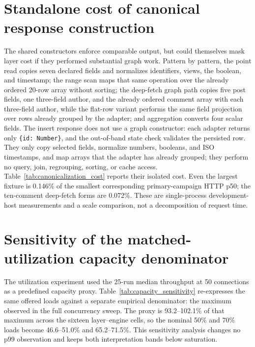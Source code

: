 \documentclass[11pt,a4paper]{article}
\newcommand{\tabledir}{tables/}
\begin{document}


\section{Standalone cost of canonical response construction}
\label{sup:canonicalization}
The shared constructors enforce comparable output, but could themselves mask layer cost if they performed substantial graph work. Pattern by pattern, the point read copies seven declared fields and normalizes identifiers, views, the boolean, and timestamp; the range scan maps that same operation over the already ordered 20-row array without sorting; the deep-fetch graph path copies five post fields, one three-field author, and the already ordered comment array with each three-field author, while the flat-row variant performs the same field projection over rows already grouped by the adapter; and aggregation converts four scalar fields. The insert response does not use a graph constructor: each adapter returns only \texttt{\{id: Number\}}, and the out-of-band state check validates the persisted row. They only copy selected fields, normalize numbers, booleans, and ISO timestamps, and map arrays that the adapter has already grouped; they perform no query, join, regrouping, sorting, or cache access. Table~\ref{tab:canonicalization_cost} reports their isolated cost. Even the largest fixture is 0.146\% of the smallest corresponding primary-campaign HTTP p50; the ten-comment deep-fetch forms are 0.072\%. These are single-process development-host measurements and a scale comparison, not a decomposition of request time.



\section{Sensitivity of the matched-utilization capacity denominator}
\label{sup:capacity-sensitivity}
The utilization experiment used the 25-run median throughput at 50 connections as a
predefined capacity proxy. Table~\ref{tab:capacity_sensitivity} re-expresses the same offered
loads against a separate empirical denominator: the maximum observed in the full concurrency
sweep. The proxy is 93.2--102.1\% of that maximum across the sixteen layer--engine cells, so the
nominal 50\% and 70\% loads become 46.6--51.0\% and 65.2--71.5\%. This sensitivity analysis
changes no p99 observation and keeps both interpretation bands below saturation.
\end{document}
